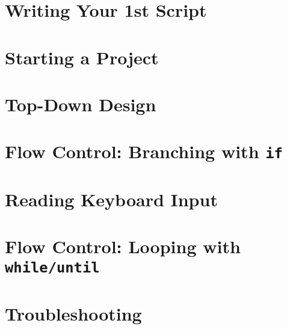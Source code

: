 \documentclass[oneside]{book}
\numberwithin{equation}{section}
\begin{document}

\section{Writing Your 1st Script}


\section{Starting a Project}


\section{Top-Down Design}


\section{Flow Control: Branching with \texttt{if}}


\section{Reading Keyboard Input}


\section{Flow Control: Looping with \texttt{while/until}}


\section{Troubleshooting}

\end{document}
